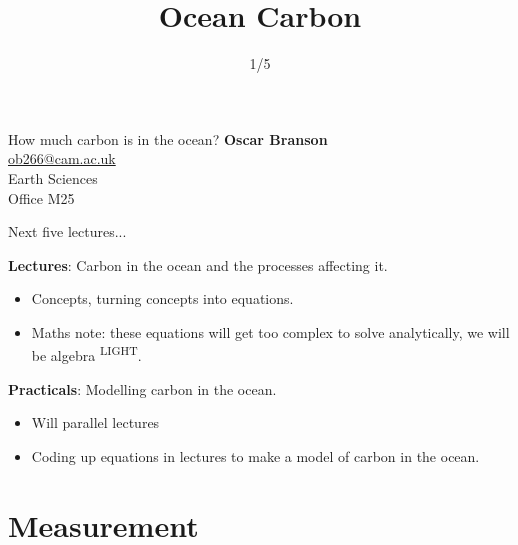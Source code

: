 


\title{Ocean Carbon}
\author{1/5}



\begin{frame}{How much carbon is in the ocean?}
    \textbf{Oscar Branson} \\ 
    \bigskip
    \href{mailto:ob266@cam.ac.uk}{ob266@cam.ac.uk} \\
    Earth Sciences \\
    Office M25
\end{frame}

\begin{frame}{Next five lectures...}

\textbf{Lectures}: Carbon in the ocean and the processes affecting it.

\begin{itemize}
    \item Concepts, turning concepts into equations. 
    \item Maths note: these equations will get too complex to solve analytically, we will be algebra \textsuperscript{LIGHT}.
\end{itemize}

\bigskip

\textbf{Practicals}: Modelling carbon in the ocean.

\begin{itemize}
    \item Will parallel lectures
    \item Coding up equations in lectures to make a model of carbon in the ocean.
\end{itemize}

\end{frame}

\section{Measurement}

